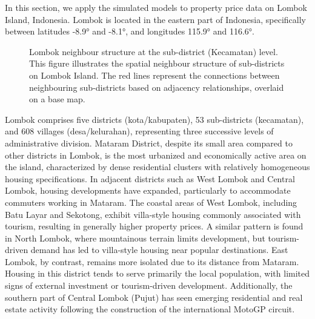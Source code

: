 \documentclass[
  default,
]{sn-jnl}
\begin{document}
In this section, we apply the simulated models to property price data on
Lombok Island, Indonesia. Lombok is located in the eastern part of
Indonesia, specifically between latitudes -8.9° and -8.1°, and
longitudes 115.9° and 116.6°.

\label{cell-fig-lombokmap}
\begin{figure}[H]


\caption{\label{fig-lombokmap}Lombok neighbour structure at the
sub-district (Kecamatan) level. This figure illustrates the spatial
neighbour structure of sub-districts on Lombok Island. The red lines
represent the connections between neighbouring sub-districts based on
adjacency relationships, overlaid on a base map.}

\end{figure}%

Lombok comprises five districts (kota/kabupaten), 53 sub-districts
(kecamatan), and 608 villages (desa/kelurahan), representing three
successive levels of administrative division. Mataram District, despite
its small area compared to other districts in Lombok, is the most
urbanized and economically active area on the island, characterized by
dense residential clusters with relatively homogeneous housing
specifications. In adjacent districts such as West Lombok and Central
Lombok, housing developments have expanded, particularly to accommodate
commuters working in Mataram. The coastal areas of West Lombok,
including Batu Layar and Sekotong, exhibit villa-style housing commonly
associated with tourism, resulting in generally higher property prices.
A similar pattern is found in North Lombok, where mountainous terrain
limits development, but tourism-driven demand has led to villa-style
housing near popular destinations. East Lombok, by contrast, remains
more isolated due to its distance from Mataram. Housing in this district
tends to serve primarily the local population, with limited signs of
external investment or tourism-driven development. Additionally, the
southern part of Central Lombok (Pujut) has seen emerging residential
and real estate activity following the construction of the international
MotoGP circuit.
\end{document}
